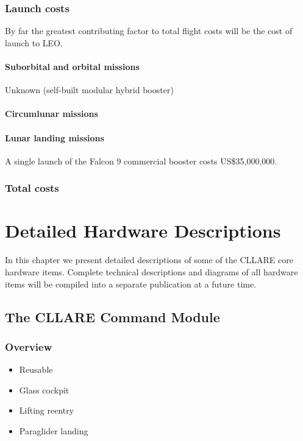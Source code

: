 \documentclass{report}
\begin{document}
\subsection{Launch costs}

By far the greatest contributing factor to total flight costs will be the cost of launch to LEO. 

\subsubsection{Suborbital and orbital missions}

Unknown (self-built modular hybrid booster)

\subsubsection{Circumlunar missions}

\subsubsection{Lunar landing missions}

A single launch of the Falcon 9 commercial booster costs US\$35,000,000.

\subsection{Total costs}


\chapter{Detailed Hardware Descriptions} \label{chap:detail}

In this chapter we present detailed descriptions of some of the CLLARE core hardware items.  Complete technical descriptions and diagrams of all hardware items will be compiled into a separate publication at a future time.

\section{The CLLARE Command Module}

\subsection{Overview}

\begin{itemize}
\item Reusable
\item Glass cockpit
\item Lifting reentry
\item Paraglider landing
\end{itemize}
\end{document}

